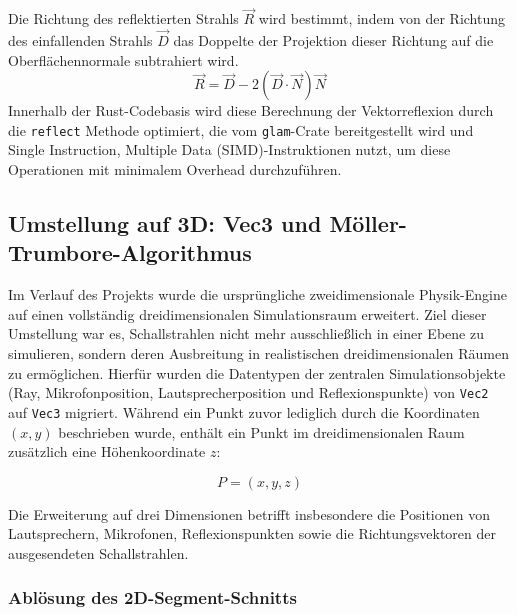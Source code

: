 \documentclass{article}
\begin{document}

    Die Richtung des reflektierten Strahls $\vec{R}$ wird bestimmt, indem von der Richtung des einfallenden Strahls $\vec{D}$ das Doppelte der Projektion dieser Richtung
    auf die Oberflächennormale subtrahiert wird.
    \[\vec{R} = \vec{D} - 2(\vec{D} \cdot \vec{N})\vec{N}\]
    Innerhalb der Rust-Codebasis wird diese Berechnung der Vektorreflexion durch die \texttt{reflect} Methode optimiert, die vom \texttt{glam}-Crate bereitgestellt wird und
    Single Instruction, Multiple Data (SIMD)-Instruktionen nutzt, um diese Operationen mit minimalem Overhead durchzuführen.

    \subsection{Umstellung auf 3D: Vec3 und Möller-Trumbore-Algorithmus}

    Im Verlauf des Projekts wurde die ursprüngliche zweidimensionale Physik-Engine auf einen vollständig dreidimensionalen Simulationsraum erweitert. Ziel dieser Umstellung war es, Schallstrahlen nicht mehr ausschließlich in einer Ebene zu simulieren, sondern deren Ausbreitung in realistischen dreidimensionalen Räumen zu ermöglichen.
    Hierfür wurden die Datentypen der zentralen
    Simulationsobjekte (Ray, Mikrofonposition, Lautsprecherposition und Reflexionspunkte) von \texttt{Vec2} auf \texttt{Vec3} migriert. Während ein Punkt zuvor lediglich durch die Koordinaten $(x,y)$ beschrieben wurde, enthält ein Punkt im dreidimensionalen Raum zusätzlich eine Höhenkoordinate $z$:

    \[
    P = (x,y,z)
    \]

    Die Erweiterung auf drei Dimensionen betrifft insbesondere die Positionen von Lautsprechern, Mikrofonen, Reflexionspunkten sowie die Richtungsvektoren der ausgesendeten Schallstrahlen.

    \subsubsection{Ablösung des 2D-Segment-Schnitts}
\end{document}
